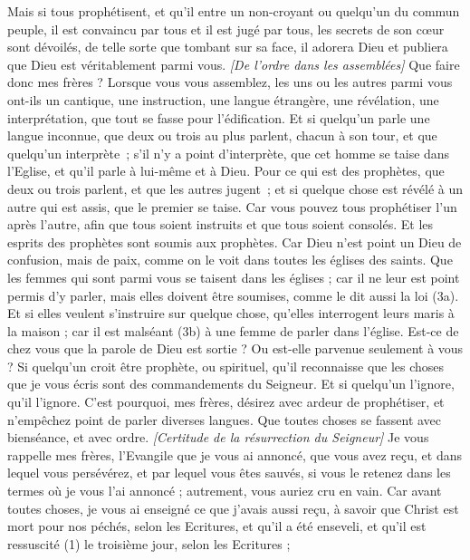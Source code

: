 \begin{multicols}{2}
Mais si tous prophétisent, et qu'il entre un non-croyant ou quelqu'un du commun peuple, il est convaincu par tous et il est jugé par tous,
les secrets de son cœur sont dévoilés, de telle sorte que tombant sur sa face, il adorera Dieu et publiera que Dieu est véritablement parmi vous.
\textit{[De l'ordre dans les assemblées]}
Que faire donc mes frères ? Lorsque vous vous assemblez, les uns ou les autres parmi vous ont-ils un cantique, une instruction, une langue étrangère, une révélation, une interprétation, que tout se fasse pour l'édification.
Et si quelqu'un parle une langue inconnue, que deux ou trois au plus parlent, chacun à son tour, et que quelqu’un interprète ;
s'il n'y a point d'interprète, que cet homme se taise dans l'Eglise, et qu'il parle à lui-même et à Dieu.
Pour ce qui est des prophètes, que deux ou trois parlent, et que les autres jugent ;
et si quelque chose est révélé à un autre qui est assis, que le premier se taise.
Car vous pouvez tous prophétiser l'un après l'autre, afin que tous soient instruits et que tous soient consolés.
Et les esprits des prophètes sont soumis aux prophètes.
Car Dieu n'est point un Dieu de confusion, mais de paix, comme on le voit dans toutes les églises des saints.
Que les femmes qui sont parmi vous se taisent dans les églises ; car il ne leur est point permis d’y parler, mais elles doivent être soumises, comme le dit aussi la loi (3a).
Et si elles veulent s’instruire sur quelque chose, qu'elles interrogent leurs maris à la maison ; car il est malséant (3b) à une femme de parler dans l'église.
Est-ce de chez vous que la parole de Dieu est sortie ? Ou est-elle parvenue seulement à vous ?
Si quelqu'un croit être prophète, ou spirituel, qu'il reconnaisse que les choses que je vous écris sont des commandements du Seigneur.
Et si quelqu'un l’ignore, qu'il l’ignore.
C'est pourquoi, mes frères, désirez avec ardeur de prophétiser, et n'empêchez point de parler diverses langues.
Que toutes choses se fassent avec bienséance, et avec ordre.
\textit{[Certitude de la résurrection du Seigneur]}
\VerseOne{}Je vous rappelle mes frères, l'Evangile que je vous ai annoncé, que vous avez reçu, et dans lequel vous persévérez,
et par lequel vous êtes sauvés, si vous le retenez dans les termes où je vous l'ai annoncé ; autrement, vous auriez cru en vain.
Car avant toutes choses, je vous ai enseigné ce que j'avais aussi reçu, à savoir que Christ est mort pour nos péchés, selon les Ecritures,
et qu'il a été enseveli, et qu'il est ressuscité (1) le troisième jour, selon les Ecritures ;

\end{multicols}
